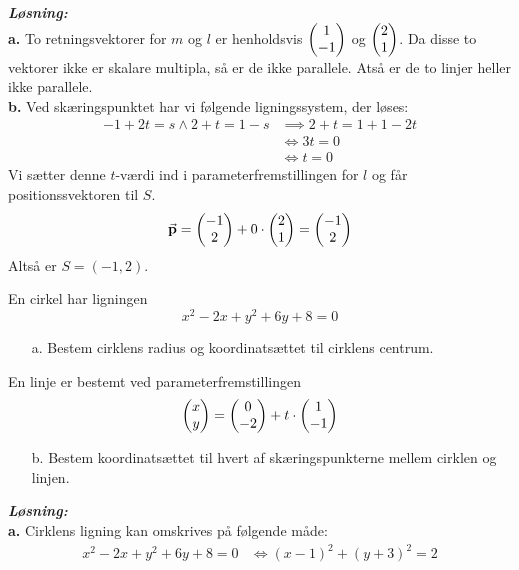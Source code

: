 \documentclass{article}
\newcommand{\sol}{\setlength{\parindent}{0cm}\textbf{\textit{Løsning:}}\setlength{\parindent}{1cm}}
\begin{document}
\sol \\
\textbf{a.}
To retningsvektorer for $m$ og $l$ er henholdsvis $\mqty(1\\ -1) $ og $\mqty(2\\ 1) $.
Da disse to vektorer ikke er skalare multipla, så er de ikke parallele.
Atså er de to linjer heller ikke parallele.\\[1ex]
\textbf{b.}
Ved skæringspunktet har vi følgende ligningssystem, der løses:
\begin{equation*}
\begin{split}
  -1+2t=s \land 2+t=1-s &\implies 2+t=1+1-2t\\
  &\iff 3t=0\\ 
  &\iff t=0
\end{split}
\end{equation*}
Vi sætter denne $t$-værdi ind i parameterfremstillingen for $l$ og får positionssvektoren til $S$. 
\begin{equation*}
\begin{split}
  \va{p} =\mqty(-1\\ 2) + 0 \cdot \mqty(2\\ 1) =\mqty(-1\\ 2) 
\end{split}
\end{equation*}
Altså er $S=(-1,2)$.
\begin{question}{}{}
  En cirkel har ligningen 
  \[
  x^2-2x+y^2+6y+8=0
  \] 
  \begin{itemize}
    \item[a.] Bestem cirklens radius og koordinatsættet til cirklens centrum.
  \end{itemize}
  En linje er bestemt ved parameterfremstillingen 
  \[
  \mqty(x\\ y) =\mqty(0\\ -2) +t \cdot \mqty(1\\ -1) 
  \] 
  \begin{itemize}
    \item[b.] Bestem koordinatsættet til hvert af skæringspunkterne mellem cirklen og linjen.
  \end{itemize}
\end{question}
\sol \\
\textbf{a.}
Cirklens ligning kan omskrives på følgende måde:
\begin{equation*}
\begin{split}
  x^2-2x+y^2+6y+8=0 &\iff (x-1)^2+(y+3)^2=2
\end{split}
\end{equation*}
\end{document}

